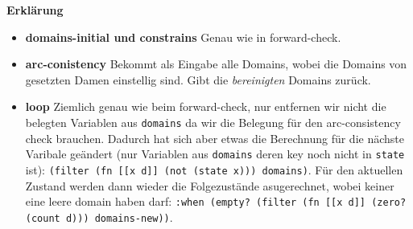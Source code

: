 \documentclass[a4paper,10pt]{article}
\begin{document}
\textbf{Erklärung}
\begin{itemize}
  \item \textbf{domains-initial und constrains} Genau wie in forward-check.
    \item \textbf{arc-conistency} Bekommt als Eingabe alle Domains, wobei die Domains von gesetzten Damen einstellig sind. Gibt die \textit{bereinigten} Domains zurück.
    \item \textbf{loop} Ziemlich genau wie beim forward-check, nur entfernen wir nicht die belegten Variablen aus \texttt{domains} da wir die Belegung für den arc-consistency check brauchen. Dadurch hat sich aber etwas die Berechnung für die nächste Varibale geändert (nur Variablen aus \texttt{domains} deren key noch nicht in \texttt{state} ist): \texttt{(filter (fn [[x d]] (not (state x))) domains)}. Für den aktuellen Zustand werden dann wieder die Folgezustände asugerechnet, wobei keiner eine leere domain haben darf: \texttt{:when (empty? (filter (fn [[x d]] (zero? (count d))) domains-new))}.
\end{itemize}
\newpage
\end{document}
